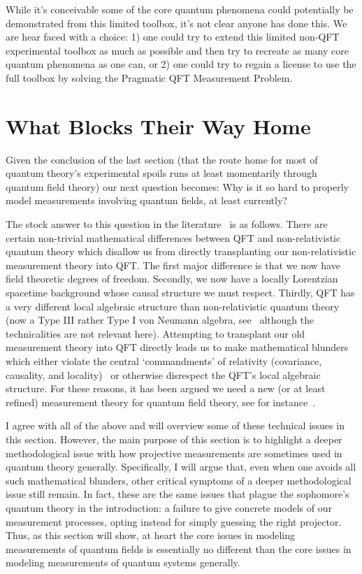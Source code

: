 \documentclass[12pt,prd,superscriptaddress,floatfix,amsmath,amssymb,amsfonts,nofootinbib]{revtex4-2}
\begin{document}
While it's conceivable some of the core quantum phenomena could potentially be demonstrated from this limited toolbox, it's not clear anyone has done this. We are hear faced with a choice: 1) one could try to extend this limited non-QFT experimental toolbox as much as possible and then try to recreate as many core quantum phenomena as one can, or 2) one could try to regain a license to use the full toolbox by solving the Pragmatic QFT Measurement Problem.

\section{What Blocks Their Way Home}\label{WhatBlocksTheirWay}
Given the conclusion of the last section (that the route home for most of quantum theory's experimental spoils runs at least momentarily through quantum field theory) our next question becomes: Why is it so hard to properly model measurements involving quantum fields, at least currently?

The stock answer to this question in the literature~\cite{pologomez2021detectorbased,Jubb2022,BorstenJubbKells,fewster1,fewster2,fewster3,Anastopoulos2022,Sorkin,TaleOfTwo,Ruep2021,JoseMariaEdu,Sorkin,Redhead1995,Dowker,Dowker2,borsten,alvaro,Adam} is as follows. There are certain non-trivial mathematical differences between QFT and non-relativistic quantum theory which disallow us from directly transplanting our non-relativistic measurement theory into QFT. The first major difference is that we now have field theoretic degrees of freedom. Secondly, we now have a locally Lorentzian spacetime background whose causal structure we must respect. Thirdly, QFT has a very different local algebraic structure than non-relativistic quantum theory (now a Type III rather Type I von Neumann algebra, see~\cite{sep-qt-nvd,Witten} although the technicalities are not relevant here). Attempting to transplant our old measurement theory into QFT directly leads us to make mathematical blunders which either violate the central `commandments' of relativity (covariance, causality, and locality)~\cite{Sorkin,Redhead1995,Dowker,Dowker2,borsten,alvaro,Adam} or otherwise disrespect the QFT's local algebraic structure. For these reasons, it has been argued we need a new (or at least refined) measurement theory for quantum field theory, see for instance~\cite{pologomez2021detectorbased,Jubb2022,fewster2}.

I agree with all of the above and will overview some of these technical issues in this section. However, the main purpose of this section is to highlight a deeper methodological issue with how projective measurements are sometimes used in quantum theory generally. Specifically, I will argue that, even when one avoids all such mathematical blunders, other critical symptoms of a deeper methodological issue still remain. In fact, these are the same issues that plague the sophomore's quantum theory in the introduction: a failure to give concrete models of our measurement processes, opting instead for simply guessing the right projector. Thus, as this section will show, at heart the core issues in modeling measurements of quantum fields is essentially no different than the core issues in modeling measurements of quantum systems generally. 
\end{document}
